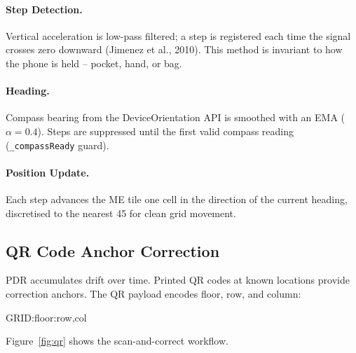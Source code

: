 \documentclass[12pt,a4paper]{article}
\begin{document}
\paragraph{Step Detection.}
Vertical acceleration is low-pass filtered; a step is registered each time the
signal crosses zero downward (Jimenez et al., 2010). This method is invariant
to how the phone is held -- pocket, hand, or bag.

\paragraph{Heading.}
Compass bearing from the DeviceOrientation API is smoothed with an EMA
($\alpha{=}0.4$). Steps are suppressed until the first valid compass reading
(\texttt{\_compassReady} guard).

\paragraph{Position Update.}
Each step advances the ME tile one cell in the direction of the current
heading, discretised to the nearest 45\textdegree{} for clean grid movement.

\subsection{QR Code Anchor Correction}

PDR accumulates drift over time. Printed QR codes at known locations provide
correction anchors. The QR payload encodes floor, row, and column:

\begin{center}
\ttfamily
GRID:\textlangle floor\textrangle:\textlangle row\textrangle,\textlangle col\textrangle
\end{center}

Figure~\ref{fig:qr} shows the scan-and-correct workflow.
\end{document}
